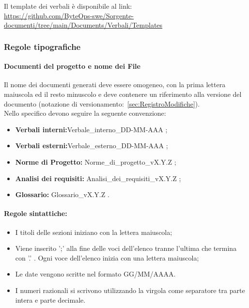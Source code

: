 \documentclass{article}
\begin{document}
\begin{enumerate}
Il template dei verbali è disponibile al link:\\ \href{https://github.com/ByteOps-swe/Sorgente-documenti/tree/main/Documents/Verbali/Templates}{https://github.com/ByteOps-swe/Sorgente-documenti/tree/main/Documents/Verbali/Templates}



\subsubsection{Regole tipografiche}
\paragraph*{Documenti del progetto e nome dei File}\label{sec:NomeFile}
Il nome dei documenti generati deve essere omogeneo, con la prima lettera maiuscola ed il resto minuscolo e deve contenere un riferimento alla versione del documento (notazione di versionamento:~\ref{sec:RegistroModifiche}).\\
Nello specifico devono seguire la seguente convenzione:
\begin{itemize}
    \item \textbf{Verbali interni:}Verbale\_interno\_DD-MM-AAA ;
    \item \textbf{Verbali esterni:}Verbale\_esterno\_DD-MM-AAA ;
    \item \textbf{Norme di Progetto:} Norme\_di\_progetto\_vX.Y.Z ;
    \item \textbf{Analisi dei requisiti:} Analisi\_dei\_requisiti\_vX.Y.Z ;
    \item \textbf{Glossario:} Glossario\_vX.Y.Z .
\end{itemize}

\paragraph*{Regole sintattiche:}
\begin{itemize}
    \item I titoli delle sezioni iniziano con la lettera maiuscola;
    \item Viene inserito ';' alla fine delle voci dell'elenco tranne l'ultima che termina con '.' . Ogni voce dell'elenco inizia con una lettera maiuscola;
    \item  Le date vengono scritte nel formato GG/MM/AAAA.
    \item  I numeri razionali si scrivono utilizzando la virgola come separatore tra parte intera e parte decimale.
\end{itemize}

\end{enumerate}
\end{document}
